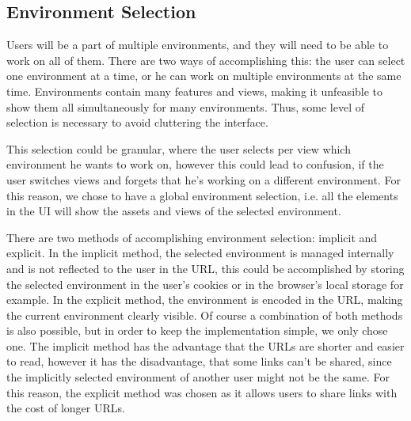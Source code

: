 


\subsection{Environment Selection}

Users will be a part of multiple environments, and they will need to be able to work on
all of them.
There are two ways of accomplishing this: the user can select one environment at a time,
or he can work on multiple environments at the same time.
%
%
Environments contain many features and views, making it unfeasible to show them all
simultaneously for many environments.
Thus, some level of selection is necessary to avoid cluttering the interface.

%
This selection could be granular, where the user selects per view which environment he
wants to work on, however this could lead to confusion, if the user switches views and
forgets that he's working on a different environment.
For this reason, we chose to have a global environment selection, i.e. all the elements in
the UI will show the assets and views of the selected environment.

There are two methods of accomplishing environment selection: implicit and explicit.
In the implicit method, the selected environment is managed internally and is not
reflected to the user in the URL, this could be accomplished by storing the selected
environment in the user's cookies or in the browser's local storage for example.
In the explicit method, the environment is encoded in the URL,
making the current environment clearly visible.
Of course a combination of both methods is also possible, but in order to keep the
implementation simple, we only chose one.
The implicit method has the advantage that the URLs are shorter and easier to read,
however it has the disadvantage, that some links can't be shared, since the implicitly
selected environment of another user might not be the same.
For this reason, the explicit method was chosen as it allows users to share links with the
cost of longer URLs.

